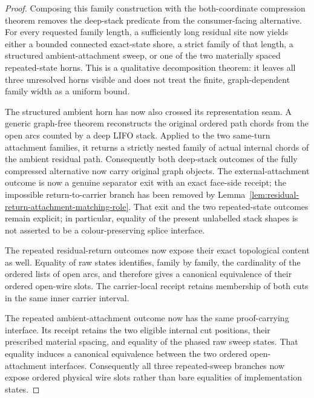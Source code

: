\begin{proof}
Composing this family construction with the both-coordinate compression
theorem removes the deep-stack predicate from the consumer-facing
alternative.  For every requested family length, a sufficiently long
residual site now yields either a bounded connected exact-state shore, a
strict family of that length, a structured ambient-attachment sweep, or one
of the two materially spaced repeated-state horns.  This is a qualitative
decomposition theorem: it leaves all three unresolved horns visible and does
not treat the finite, graph-dependent family width as a uniform bound.

The structured ambient horn has now also crossed its representation seam.
A generic graph-free theorem reconstructs the original ordered path chords
from the open arcs counted by a deep LIFO stack.  Applied to the two
same-turn attachment families, it returns a strictly nested family of actual
internal chords of the ambient residual path.  Consequently both deep-stack
outcomes of the fully compressed alternative now carry original graph
objects.  The external-attachment outcome is now a genuine separator exit
with an exact face-side receipt; the impossible return-to-carrier branch has
been removed by
Lemma~\ref{lem:residual-return-attachment-matching-role}.  That exit and the
two repeated-state outcomes remain explicit; in particular, equality of the
present unlabelled stack shapes is not asserted to be a colour-preserving
splice interface.

The repeated residual-return outcomes now expose their exact topological
content as well.  Equality of raw states identifies, family by family, the
cardinality of the ordered lists of open arcs, and therefore gives a
canonical equivalence of their ordered open-wire slots.  The carrier-local
receipt retains membership of both cuts in the same inner carrier interval.

The repeated ambient-attachment outcome now has the same proof-carrying
interface.  Its receipt retains the two eligible internal cut positions,
their prescribed material spacing, and equality of the phased raw sweep
states.  That equality induces a canonical equivalence between the two
ordered open-attachment interfaces.
Consequently all three repeated-sweep branches now expose ordered physical
wire slots rather than bare equalities of implementation states.


\end{proof}
